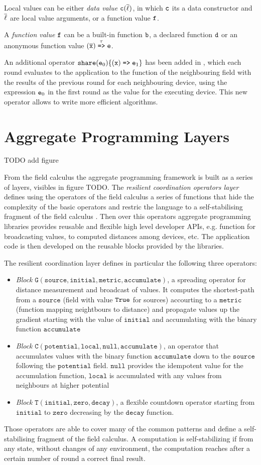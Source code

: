 Local values can be either \textit{data value} $\mathtt{c}(\overline{\ell})$, in which $\mathtt{c}$ its a data constructor and $\overline {\ell}$ are local value arguments, or a function value $\mathtt{f}$.

A \textit{function value} $\mathtt{f}$ can be a built-in function $\mathtt{b}$, a declared function $\mathtt{d}$ or an anonymous function value $(\overline{\mathtt{x}}) \stackrel{\tau}{\mathrm{\texttt{=>}}} \mathtt{e}$.

An additional operator $\mathtt{share}(\mathtt{e}_0)\{(\mathtt{x}) \stackrel{}{\mathrm{\texttt{=>}}} \mathtt{e}_1\}$ has been added in \cite{Share}, which each round evaluates to the application to the function of the neighbouring field with the results of the previous round for each neighbouring device, using the expression $\mathtt{e}_0$ in the first round as the value for the executing device. This new operator allows to write more efficient algorithms.


\section{Aggregate Programming Layers}

TODO add figure

From the field calculus the aggregate programming framework is built as a series of layers, visibles in figure TODO. The \textit{resilient coordination operators layer} defines using the operators of the field calculus a series of functions that hide the complexity of the basic operators and restric the language to a self-stabilising fragment  of the field calculus \cite{SelfStabilizing}. Then over this operators aggregate programming libraries provides reusable and flexible high level developer APIs, e.g. function for broadcasting values, to computed distances among devices, etc. The application code is then developed on the reusable blocks provided by the libraries.

The resilient coordination layer defines in particular the following three operators:
\begin{itemize}
\item \textit{Block} $\mathtt{G(source, initial, metric, accumulate)}$, a spreading operator for distance measurement and broadcast of values. It computes the shortest-path from a $\mathtt{source}$ (field with value $\mathtt{True}$ for sources) accourting to a $\mathtt{metric}$ (function mapping neightbours to distance) and propagate values up the gradient starting with the value of $\mathtt{initial}$ and accumulating with the binary function $\mathtt{accumulate}$
\item \textit{Block} $\mathtt{C(potential, local, null, accumulate)}$, an operator that accumulates values with the binary function $\mathtt{accumulate}$ down to the $\mathtt{source}$ following the $\mathtt{potential}$ field. $\mathtt{null}$ provides the idempotent value for the accumulation function, $\mathtt{local}$ is accumulated with any values from neighbours at higher potential
\item \textit{Block} $\mathtt{T(initial, zero, decay)}$, a flexible countdown operator starting from $\mathtt{initial}$ to $\mathtt{zero}$ decreasing by the $\mathtt{decay}$ function.
\end{itemize}

Those operators are able to cover many of the common patterns and define a self-stabilising fragment of the field calculus. A computation is self-stabilizing if from any state, without changes of any environment, the computation reaches after a certain number of round a correct final result.
